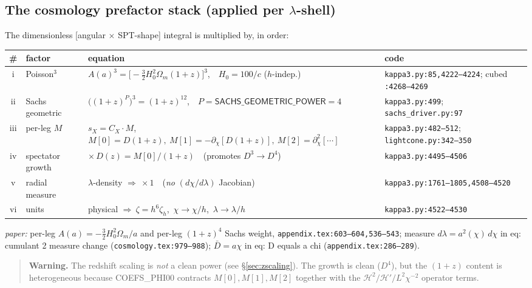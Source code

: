 \documentclass[11pt]{article}
\newcommand{\code}[1]{\texttt{\footnotesize #1}}
\newcommand{\eq}[1]{\textsf{#1}}                 %
\newcommand{\chh}{\chi}
\newcommand{\lam}{\lambda}
\newcommand{\Dgrow}{D}
\newcommand{\Hcal}{\mathcal{H}}
\begin{document}
\subsection{The cosmology prefactor stack (applied per $\lam$-shell)}
\label{sec:prefac}
The dimensionless [angular $\times$ SPT-shape] integral is multiplied by, in order:
\begin{center}
\renewcommand{\arraystretch}{1.5}
\scriptsize
\begin{tabular}{@{}c l >{\raggedright\arraybackslash}p{5.9cm} >{\raggedright\arraybackslash}p{4.1cm}@{}}
\toprule
\# & factor & equation & code \\
\midrule
i  & Poisson$^3$ & $A(a)^3=\bigl[-\tfrac32 H_0^2\Omega_m(1{+}z)\bigr]^3$,\ \ $H_0=100/c$ ($h$-indep.) & \code{kappa3.py:85,4222--4224}; cubed \code{:4268--4269} \\
ii & Sachs geometric & $\bigl((1{+}z)^P\bigr)^3=(1{+}z)^{12}$,\ \ $P=\textsf{SACHS\_GEOMETRIC\_POWER}=4$ & \code{kappa3.py:499}; \code{sachs\_driver.py:97} \\
iii& per-leg $M$ & $s_X=C_X\!\cdot\!M$,\ $M[0]{=}\Dgrow(1{+}z),\ M[1]{=}-\partial_\chh[\Dgrow(1{+}z)],\ M[2]{=}\partial_\chh^2[\cdots]$ & \code{kappa3.py:482--512}; \code{lightcone.py:342--350} \\
iv & spectator growth & $\times\,\Dgrow(z)=M[0]/(1{+}z)$\ \ (promotes $\Dgrow^3\!\to\!\Dgrow^4$) & \code{kappa3.py:4495--4506} \\
v  & radial measure & $\lam$-density $\Rightarrow\ \times 1$\ \ (\emph{no} $(d\chh/d\lam)$ Jacobian) & \code{kappa3.py:1761--1805,4508--4520} \\
vi & units & physical $\Rightarrow\ \zeta=h^6\zeta_h$,\ $\chh\!\to\!\chh/h$,\ $\lam\!\to\!\lam/h$ & \code{kappa3.py:4522--4530} \\
\bottomrule
\end{tabular}
\end{center}
\textit{paper:} per-leg $A(a)=-\tfrac32 H_0^2\Omega_m/a$ and per-leg $(1{+}z)^4$ Sachs weight,
\code{appendix.tex:603--604,536--543}; measure $d\lam=a^2(\chh)\,d\chh$ in
\eq{eq: cumulant 2 measure change} (\code{cosmology.tex:979--988}); $\bar D=a\chh$ in
\eq{eq: D equals a chi} (\code{appendix.tex:286--289}).

\begin{quote}\small\color{red!60!black}
\textbf{Warning.} The redshift scaling is \emph{not} a clean power (see \S\ref{sec:zscaling}).
The growth is clean ($\Dgrow^4$), but the $(1{+}z)$ content is heterogeneous because
\textsf{COEFS\_PHI00} contracts $M[0],M[1],M[2]$ together with the $\Hcal^2/\Hcal'/L^2\chh^{-2}$
operator terms.
\end{quote}
\end{document}

